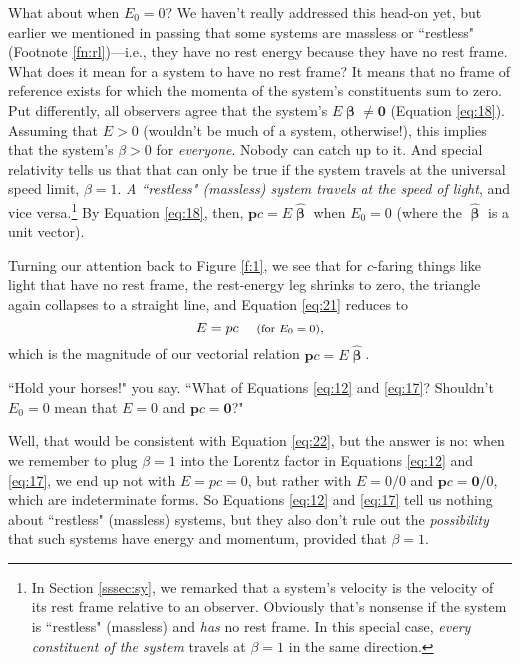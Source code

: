 \documentclass[12pt]{article}
\renewcommand{\vv}[1]{\mathbf{#1}}
\newcommand{\vvbeta}{\bm{\upbeta}}
\newcommand{\hatbeta}{\bm{\hat{\upbeta}}}
\begin{document}
What about when $E_0 = 0$? We haven't really addressed this head-on yet, but earlier we mentioned in passing that some systems are massless or ``restless" (Footnote \ref{fn:rl})---i.e., they have no rest energy because they have no rest frame. What does it mean for a system to have no rest frame? It means that no frame of reference exists for which the momenta of the system's constituents sum to zero. Put differently, all observers agree that the system's $E \vvbeta \neq \vv 0$ (Equation \ref{eq:18}). Assuming that $E > 0$ (wouldn't be much of a system, otherwise!), this implies that the system's $\beta > 0$ for \emph{everyone}. Nobody can catch up to it. And special relativity tells us that that can only be true if the system travels at the universal speed limit, $\beta = 1$. \emph{A ``restless" (massless) system travels at the speed of light}, and vice versa.\footnote{In Section \ref{sssec:sy}, we remarked that a system's velocity is the velocity of its rest frame relative to an observer. Obviously that's nonsense if the system is ``restless" (massless) and \emph{has} no rest frame. In this special case, \emph{every constituent of the system} travels at $\beta = 1$ in the same direction.} By Equation \ref{eq:18}, then, $\vv p c = E \hatbeta$ when $E_0 = 0$ (where the $\hatbeta$ is a unit vector).

Turning our attention back to Figure \ref{f:1}, we see that for $c$-faring things like light that have no rest frame, the rest-energy leg shrinks to zero, the triangle again collapses to a straight line, and Equation \ref{eq:21} reduces to
\begin{equation}\label{eq:22}
E=p c \quad \textrm{\footnotesize{ (for $E_0=0$)}},
\end{equation}
which is the magnitude of our vectorial relation $\vv p c = E \hatbeta$.

``Hold your horses!" you say. ``What of Equations \ref{eq:12} and \ref{eq:17}? Shouldn't $E_0 = 0$ mean that $E = 0$ and $\vv p c = \vv 0$?"

Well, that would be consistent with Equation \ref{eq:22}, but the answer is no: when we remember to plug $\beta = 1$ into the Lorentz factor in Equations \ref{eq:12} and \ref{eq:17}, we end up not with $E = p c = 0$, but rather with $E = 0/0$ and $\vv p c = \vv 0 / 0$, which are indeterminate forms. So Equations \ref{eq:12} and \ref{eq:17} tell us nothing about ``restless" (massless) systems, but they also don't rule out the \emph{possibility} that such systems have energy and momentum, provided that $\beta = 1$.
\end{document}
